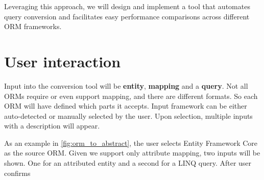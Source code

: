 Leveraging this approach, we will design and implement a tool that automates query conversion and facilitates easy performance comparisons across different ORM frameworks.

\section{User interaction}
Input into the conversion tool will be \textbf{entity}, \textbf{mapping} and a \textbf{query}. Not all ORMs require or even support mapping, and there are different formats. So each ORM will have defined which parts it accepts. Input framework can be either auto-detected or manually selected by the user. Upon selection, multiple inputs with a description will appear.

As an example in \autoref{fig:orm_to_abstract}, the user selects Entity Framework Core as the source ORM. Given we support only attribute mapping, two inputs will be shown. One for an attributed entity and a second for a LINQ query. After user confirms 

